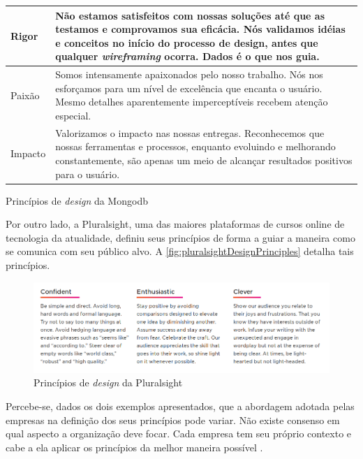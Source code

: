 \begin{quadro}[!htb]
\begin{tabular}{|m{2cm}|m{12cm}|}
		 Rigor & Não estamos satisfeitos com nossas soluções até que as testamos e comprovamos sua eficácia. Nós validamos idéias e conceitos no início do processo de design, antes que qualquer \textit{wireframing} ocorra. Dados é o que nos guia. \\\hline
		 
		 Paixão & Somos intensamente apaixonados pelo nosso trabalho. Nós nos esforçamos para um nível de excelência que encanta o usuário. Mesmo detalhes aparentemente imperceptíveis recebem atenção especial. \\\hline
		 
		 Impacto & Valorizamos o impacto nas nossas entregas. Reconhecemos que nossas ferramentas e processos, enquanto evoluindo e melhorando constantemente, são apenas um meio de alcançar resultados positivos para o usuário. \\\hline
			
	\end{tabular}
	\caption{Princípios de \textit{design} da Mongodb}
	\label{table:mongodbDesignPrinciples}
	\end{quadro}

Por outro lado, a Pluralsight, uma das maiores plataformas de cursos online de tecnologia da atualidade, definiu seus princípios de forma a guiar a maneira como se comunica com seu público alvo. A \autoref{fig:pluralsightDesignPrinciples} detalha tais princípios.

\begin{figure}
	\includegraphics[width=\linewidth]{./04-figuras/02_referencial_teorico/pluralsight-principles.png}
	\caption{Princípios de \textit{design} da Pluralsight}
  \label{fig:pluralsightDesignPrinciples}
\end{figure}

Percebe-se, dados os dois exemplos apresentados, que a abordagem adotada pelas empresas na definição dos seus princípios pode variar. Não existe consenso em qual aspecto a organização deve focar. Cada empresa tem seu próprio contexto e cabe a ela aplicar os princípios da melhor maneira possível \cite{kholmatova2017design}.

